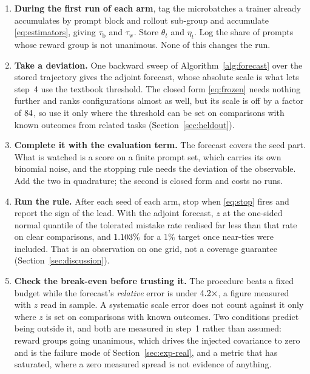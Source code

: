 \begin{enumerate}\itemsep2pt
  \item \textbf{During the first run of each arm}, tag the microbatches a trainer already
  accumulates by prompt block and rollout sub-group and accumulate \eqref{eq:estimators}, giving
  $\tau_{\mathrm{b}}$ and $\tau_{\mathrm{w}}$. Store $\theta_t$ and $\eta_t$. Log the share of
  prompts whose reward group is not unanimous. None of this changes the run.

  \item \textbf{Take a deviation.} One backward sweep of Algorithm~\ref{alg:forecast} over the
  stored trajectory gives the adjoint forecast, whose absolute scale is what lets step~4 use the
  textbook threshold. The closed form \eqref{eq:frozen} needs nothing further and ranks
  configurations almost as well, but its scale is off by a factor of $84$, so use it
  only where the threshold can be set on comparisons with known outcomes from related tasks
  (Section~\ref{sec:heldout}).

  \item \textbf{Complete it with the evaluation term.} The forecast covers the seed part. What is
  watched is a score on a finite prompt set, which carries its own binomial noise, and the stopping
  rule needs the deviation of the observable. Add the two in quadrature; the second is closed form
  and costs no runs.

  \item \textbf{Run the rule.} After each seed of each arm, stop when \eqref{eq:stop} fires and
  report the sign of the lead. With the adjoint forecast, $z$ at the one-sided normal quantile of
  the tolerated mistake rate realised far less than that rate on clear comparisons, and
  $1.103\%$ for a $1\%$ target once near-ties were included. That is
  an observation on one grid, not a coverage guarantee (Section~\ref{sec:discussion}).

  \item \textbf{Check the break-even before trusting it.} The procedure beats a fixed budget while
  the forecast's \emph{relative} error is under $4.2\times$, a figure measured
  with $z$ read in sample. A systematic scale error does not count against it only where $z$ is set
  on comparisons with known outcomes. Two conditions predict being outside
  it, and both are measured in step~1 rather than assumed: reward groups going unanimous, which
  drives the injected covariance to zero and is the failure mode of
  Section~\ref{sec:exp-real}, and a metric that has saturated, where a zero measured spread is not
  evidence of anything.
\end{enumerate}


